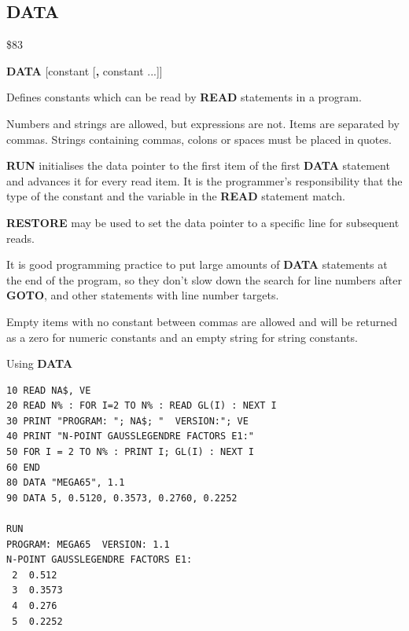 \subsection{DATA}
\begin{description}[leftmargin=2cm,style=nextline]
\item [Token:]   \$83

\item [Format:]  {\bf DATA} [constant [{\bf,} constant ...]]

\item [Usage:]   Defines constants which can be read by {\bf READ} statements in a program.

                 Numbers and strings are allowed, but expressions are not. Items are separated by commas. Strings containing commas, colons or spaces must be placed in quotes.

                 {\bf RUN} initialises the data pointer to the first item of the first {\bf DATA} statement and advances it for every read item. It is the programmer's responsibility that the type of the constant and the variable in the {\bf READ} statement match.

                 {\bf RESTORE} may be used to set the data pointer to a specific line for subsequent reads.

\item [Remarks:] It is good programming practice to put large amounts of {\bf DATA} statements at the end of the program, so they don't slow down the search for line numbers after {\bf GOTO}, and other statements with line number targets.

                 Empty items with no constant between commas are allowed and will be returned as a zero for numeric constants and an empty string for string constants.

\item [Example:] Using {\bf DATA}

\begin{tcolorbox}[colback=black,coltext=white]
\verbatimfont{\codefont}
\begin{verbatim}
10 READ NA$, VE
20 READ N% : FOR I=2 TO N% : READ GL(I) : NEXT I
30 PRINT "PROGRAM: "; NA$; "  VERSION:"; VE
40 PRINT "N-POINT GAUSSLEGENDRE FACTORS E1:"
50 FOR I = 2 TO N% : PRINT I; GL(I) : NEXT I
60 END
80 DATA "MEGA65", 1.1
90 DATA 5, 0.5120, 0.3573, 0.2760, 0.2252

RUN
PROGRAM: MEGA65  VERSION: 1.1
N-POINT GAUSSLEGENDRE FACTORS E1:
 2  0.512
 3  0.3573
 4  0.276
 5  0.2252
\end{verbatim}
\end{tcolorbox}
\end{description}

